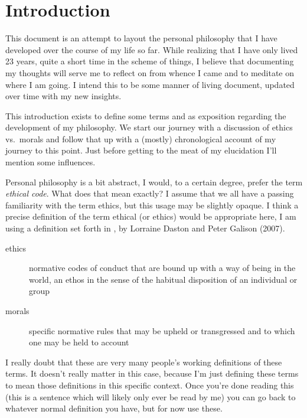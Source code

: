 \documentclass[./butidigress.tex]{subfiles}
\begin{document}
\chapter{Introduction}\label{chap:intro}
\newpage

\setcounter{footnote}{0}

This document is an attempt to layout the personal philosophy that I have developed over the course of my life so far.
While realizing that I have only lived 23 years, quite a short time in the scheme of things, I believe that documenting my thoughts will serve me to reflect on from whence I came and to meditate on where I am going.
I intend this to be some manner of living document, updated over time with my new insights.

This introduction exists to define some terms and as exposition regarding the development of my philosophy.
We start our journey with a discussion of ethics vs.\ morals and follow that up with a (mostly) chronological account of my journey to this point.
Just before getting to the meat of my elucidation I'll mention some influences.

\label{sec:ethics}
Personal philosophy is a bit abstract, I would, to a certain degree, prefer the term \emph{ethical code}.
What does that mean exactly?
I assume that we all have a passing familiarity with the term ethics, but this usage may be slightly opaque.
I think a precise definition of the term ethical (or ethics) would be appropriate here, I am using a definition set forth in , by Lorraine Daston and Peter Galison (2007).\autocite{objectivity}
\begin{description}
    \item [ethics] normative codes of conduct that are bound up with a way of being in the world, an ethos in the sense of the habitual disposition of an individual or group
    \item [morals] specific normative rules that may be upheld or transgressed and to which one may be held to account
\end{description}

I really doubt that these are very many people's working definitions of these terms.
It doesn't really matter in this case, because I'm just defining these terms to mean those definitions in this specific context.
Once you're done reading this (this is a sentence which will likely only ever be read by me) you can go back to whatever normal definition you have, but for now use these.
\end{document}
